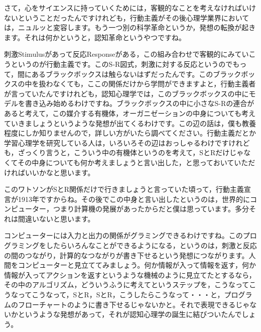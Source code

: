 \documentclass{ltjsbook}
\begin{document}
さて，心をサイエンスに持っていくためには，客観的なことを考えなければいけないということだったんですけれども，行動主義がその後心理学業界においては，ニュルッと変容します。もう一つ別の科学革命というか，発想の転換が起きます。それは何かというと，認知革命というやつですね。

刺激Stimulusがあって反応Responseがある，この組み合わせで客観的にみていこうというのが行動主義です。このS-R図式，刺激に対する反応というのでもって，間にあるブラックボックスは触らないはずだったんです。このブラックボックスの中を扱わなくても，ここの関係だけから学問ができますよと，行動主義者が言っていたんですけれども，認知心理学では，このブラックボックスの中にモデルを書き込み始めるわけですね。ブラックボックスの中に小さなS-Rの連合があると考えて，この媒介する有機体，オーガニゼーションの中身についても考えていきましょうというような発想が出てくるわけです。この辺の話は，僕も教養程度にしか知りませんので，詳しい方がいたら調べてください。行動主義だとか学習心理学を研究している人は，いろいろその辺はおっしゃるわけですけれども，ざっくり言うと，こういう中の有機体というのを考えて，SとRだけじゃなくてその中身についても何か考えましょうと言い出した，と思っておいていただければいいかなと思います。

このワトソンがSとR関係だけで行きましょうと言っていた頃って，行動主義宣言が1913年ですからね\parencite{Watson1913}。その後でこの中身と言い出したというのは，世界的にコンピューター，つまり計算機の発展があったからだと僕は思っています。多分それは間違いないと思います。

コンピューターには入力と出力の関係がグラミングできるわけですね。このプログラミングをしたらいろんなことができるようになる，というのは，刺激と反応の間のつながり，計算的なつながりが書き下せるという発想につながります。人間をコンピューターと見立ててみましょう。何か情報が入って情報を返す，何か情報が入ってアクションを返すというような機械のように見立てたとするなら，その中のアルゴリズム，どういうふうに考えてというステップを，こうなってこうなってこうなって，SとR，SとR，こうしたらこうなって・・・と，プログラムのフローチャートのように書き下せるじゃないかと。それで表現できるじゃないかというような発想があって，それが認知心理学の誕生に結びついたんでしょう。
\end{document}
